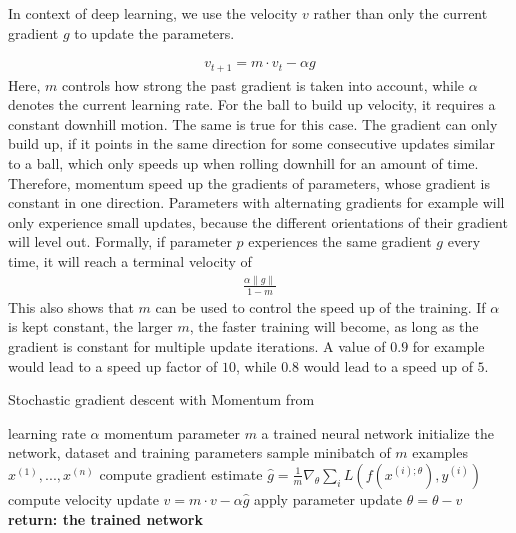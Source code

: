 In context of deep learning, we use the velocity $v$ rather than only the
current gradient $g$ to update the parameters.

\begin{align}
    v_{t+1}=m \cdot v_t - \alpha g
\end{align}
Here, $m$ controls how strong the past gradient is taken into account,
while $\alpha$ denotes the current learning rate. For the ball to build up
velocity, it requires a constant downhill motion. The same is true for this
case. The gradient can only build up, if it points in the same direction for
some consecutive updates similar to a ball, which only speeds up when rolling
downhill for an amount of time. Therefore, momentum speed up the gradients of
parameters, whose gradient is constant in one direction. Parameters with
alternating gradients for example will only experience small updates, because the
different orientations of their gradient will level out. Formally, if parameter
$p$ experiences the same gradient $g$ every time, it will reach a terminal velocity
of
\begin{align}
    \frac{\alpha \lVert g \rVert}{1-m}
\end{align}
This also shows that $m$ can be used to control the speed up of the
training. If $\alpha$ is kept constant, the larger $m$, the faster
training will become, as long as the gradient is constant for multiple update
iterations. A value of $0.9$ for example would lead to a speed up factor of
$10$, while $0.8$ would lead to a speed up of $5$.

\begin{algorithm}
    \begin{algorithmic}[1]
        \caption{Stochastic gradient descent with Momentum from \cite{Goodfellow-et-al-2016}}
        \REQUIRE learning rate $\alpha$
        \REQUIRE momentum parameter $m$
        \ENSURE a trained neural network
        \STATE initialize the network, dataset and training parameters
            \STATE sample minibatch of $m$ examples ${x^{(1)}, ... ,x^{(n)}}$
            \STATE compute gradient estimate $\hat{g}=\frac{1}{m} \nabla_\theta \sum_i L(f(x^{(i);\theta}),y^{(i)})$
            \STATE compute velocity update $v=m \cdot v - \alpha \hat{g}$
            \STATE apply parameter update $\theta=\theta-v$
        \ENDWHILE
        \STATE \textbf{return: the trained network}
    \end{algorithmic}
\end{algorithm}

